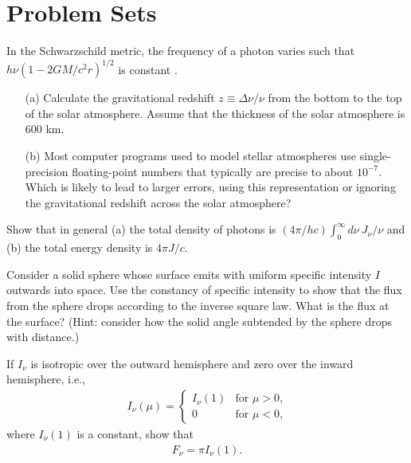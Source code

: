 
\chapter{Problem Sets}


\clearpage
\problemset

\begin{problem}
In the Schwarzschild metric, the frequency of a photon varies such that
$h\nu(1-2GM/c^2r)^{1/2}$ is constant \cite*[p.\ 187 and p.\ 659,
  although note that these authors set $G = c = 1$]{Misner-1973}.
\begin{enumerate}
\item[(a)]
Calculate the gravitational redshift $z \equiv \Delta\nu/\nu$ from the bottom to the top of the solar atmosphere. Assume that the thickness of the solar atmosphere is 600 km.
\item[(b)] Most computer programs used to model stellar atmospheres use
  single-precision floating-point numbers that typically are precise to
  about $10^{-7}$. Which is likely to lead to larger errors, using this
  representation or ignoring the gravitational redshift across the solar
  atmosphere?
\label{problem-gravitational-redshift}
\end{enumerate}
\end{problem}

\begin{problem}
\label{problem-photon-density}
\label{problem-energy-density}
Show that in general (a) the total density of photons is $(4\pi/h c)
\int_0^\infty\!d\nu\: J_\nu / \nu$ and (b) the total energy density is
$4\pi J / c$.
\end{problem}

\begin{problem}
Consider a solid sphere whose surface emits with uniform specific
intensity $I$ outwards into space. Use the constancy of specific
intensity to show that the flux from the sphere drops according to the
inverse square law. What is the flux at the surface? (Hint: consider how
the solid angle subtended by the sphere drops with distance.)
\end{problem}

\begin{problem}
\label{problem-flux-from-surface}
If $I_\nu$ is
isotropic over the outward hemisphere and zero over the
inward hemisphere, i.e.,
\begin{align}
I_\nu(\mu) =
\begin{cases}
I_\nu(1)&\mbox{for $\mu>0$,}\\
0&\mbox{for $\mu<0$,}
\end{cases}
\end{align}
where $I_\nu(1)$ is a constant, 
show that
\begin{align}
F_\nu = \pi I_\nu(1).
\end{align}
\end{problem}


